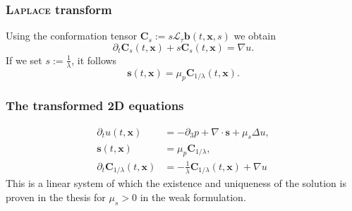 \documentclass[12pt,a4paper,handout]{beamer}
\theoremstyle{definition}
\theoremstyle{plain}
\newcommand{\bfb}{\bm{b}}
\newcommand{\bfs}{\bm{s}}
\newcommand{\bfC}{\bm{C}}
\newcommand{\bfx}{\bm{x}}
\begin{document}
\begin{frame}
    \frametitle{\textsc{Laplace} transform}
    Using the conformation tensor $\bfC_s:=s\mathcal{L}_\tau{\bfb}(t,\bfx,s)$ we obtain
    \begin{equation*}
         \partial_t\bfC_s(t,\bfx)+s\bfC_s(t,\bfx)=\nabla u.
    \end{equation*}
    If we set $s:=\frac{1}{\lambda}$, it follows
    \begin{equation*}
        \bfs(t,\bfx)=\mu_p\bfC_{1/\lambda}(t,\bfx).
    \end{equation*}
\end{frame}
\begin{frame}
    \frametitle{The transformed 2D equations}
    \begin{align*}
        \partial_t u(t,\bfx) &= -\partial_3 p +\nabla\cdot \bfs+\mu_s\Delta u,\\
        \label{eq:transfeq2}
        \bfs(t,\bfx)&=\mu_p\bfC_{1/\lambda},\\
        \partial_t\bfC_{1/\lambda}(t,\bfx) &= -\frac{1}{\lambda}\bfC_{1/\lambda}(t,\bfx)+\nabla u    \end{align*}
        This is a linear system of which the existence and uniqueness of the solution is proven in the thesis for $\mu_s>0$ in the weak formulation.
\end{frame}
\end{document}

